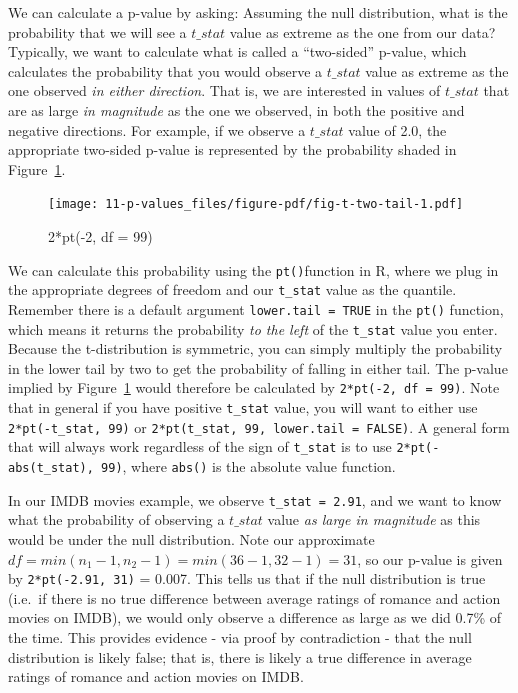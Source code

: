 \documentclass[
  letterpaper,
  DIV=11,
  numbers=noendperiod]{scrreprt}
\theoremstyle{definition}
\theoremstyle{remark}
\begin{document}
We can calculate a p-value by asking: Assuming the null distribution,
what is the probability that we will see a \(t\_stat\) value as extreme
as the one from our data? Typically, we want to calculate what is called
a ``two-sided'' p-value, which calculates the probability that you would
observe a \(t\_stat\) value as extreme as the one observed \emph{in
either direction}. That is, we are interested in values of \(t\_stat\)
that are as large \emph{in magnitude} as the one we observed, in both
the positive and negative directions. For example, if we observe a
\(t\_stat\) value of 2.0, the appropriate two-sided p-value is
represented by the probability shaded in Figure~\ref{fig-t-two-tail}.

\begin{figure}

{\centering \texttt{[image: 11-p-values\_files/figure-pdf/fig-t-two-tail-1.pdf]}

}

\caption{\label{fig-t-two-tail}2*pt(-2, df = 99)}

\end{figure}

We can calculate this probability using the \texttt{pt()}function in R,
where we plug in the appropriate degrees of freedom and our
\texttt{t\_stat} value as the quantile. Remember there is a default
argument \texttt{lower.tail\ =\ TRUE} in the \texttt{pt()} function,
which means it returns the probability \emph{to the left} of the
\texttt{t\_stat} value you enter. Because the t-distribution is
symmetric, you can simply multiply the probability in the lower tail by
two to get the probability of falling in either tail. The p-value
implied by Figure~\ref{fig-t-two-tail} would therefore be calculated by
\texttt{2*pt(-2,\ df\ =\ 99)}. Note that in general if you have positive
\texttt{t\_stat} value, you will want to either use
\texttt{2*pt(-t\_stat,\ 99)} or
\texttt{2*pt(t\_stat,\ 99,\ lower.tail\ =\ FALSE)}. A general form that
will always work regardless of the sign of \texttt{t\_stat} is to use
\texttt{2*pt(-abs(t\_stat),\ 99)}, where \texttt{abs()} is the absolute
value function.

In our IMDB movies example, we observe \texttt{t\_stat\ =\ 2.91}, and we
want to know what the probability of observing a \(t\_stat\) value
\emph{as large in magnitude} as this would be under the null
distribution. Note our approximate
\(df = min(n_1 - 1, n_2 - 1) = min(36 - 1, 32 - 1) = 31\), so our
p-value is given by \texttt{2*pt(-2.91,\ 31)} = 0.007. This tells us
that if the null distribution is true (i.e.~if there is no true
difference between average ratings of romance and action movies on
IMDB), we would only observe a difference as large as we did 0.7\% of
the time. This provides evidence - via proof by contradiction - that the
null distribution is likely false; that is, there is likely a true
difference in average ratings of romance and action movies on IMDB.
\end{document}
